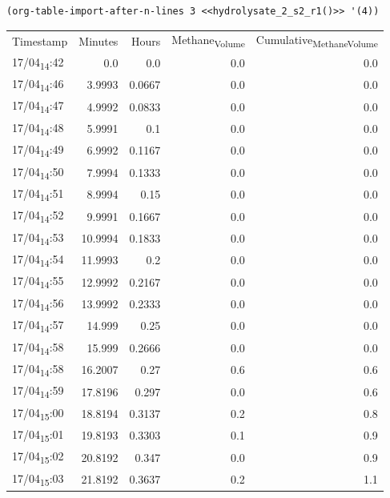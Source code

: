 \documentclass[11pt]{article}
\begin{document}
\begin{verbatim}
(org-table-import-after-n-lines 3 <<hydrolysate_2_s2_r1()>> '(4))
\end{verbatim}

\begin{center}
\begin{tabular}{lrrrr}
Timestamp & Minutes & Hours & Methane\textsubscript{Volume} & Cumulative\textsubscript{Methane}\textsubscript{Volume}\\[0pt]
17/04\textsubscript{14}:42 & 0.0 & 0.0 & 0.0 & 0.0\\[0pt]
17/04\textsubscript{14}:46 & 3.9993 & 0.0667 & 0.0 & 0.0\\[0pt]
17/04\textsubscript{14}:47 & 4.9992 & 0.0833 & 0.0 & 0.0\\[0pt]
17/04\textsubscript{14}:48 & 5.9991 & 0.1 & 0.0 & 0.0\\[0pt]
17/04\textsubscript{14}:49 & 6.9992 & 0.1167 & 0.0 & 0.0\\[0pt]
17/04\textsubscript{14}:50 & 7.9994 & 0.1333 & 0.0 & 0.0\\[0pt]
17/04\textsubscript{14}:51 & 8.9994 & 0.15 & 0.0 & 0.0\\[0pt]
17/04\textsubscript{14}:52 & 9.9991 & 0.1667 & 0.0 & 0.0\\[0pt]
17/04\textsubscript{14}:53 & 10.9994 & 0.1833 & 0.0 & 0.0\\[0pt]
17/04\textsubscript{14}:54 & 11.9993 & 0.2 & 0.0 & 0.0\\[0pt]
17/04\textsubscript{14}:55 & 12.9992 & 0.2167 & 0.0 & 0.0\\[0pt]
17/04\textsubscript{14}:56 & 13.9992 & 0.2333 & 0.0 & 0.0\\[0pt]
17/04\textsubscript{14}:57 & 14.999 & 0.25 & 0.0 & 0.0\\[0pt]
17/04\textsubscript{14}:58 & 15.999 & 0.2666 & 0.0 & 0.0\\[0pt]
17/04\textsubscript{14}:58 & 16.2007 & 0.27 & 0.6 & 0.6\\[0pt]
17/04\textsubscript{14}:59 & 17.8196 & 0.297 & 0.0 & 0.6\\[0pt]
17/04\textsubscript{15}:00 & 18.8194 & 0.3137 & 0.2 & 0.8\\[0pt]
17/04\textsubscript{15}:01 & 19.8193 & 0.3303 & 0.1 & 0.9\\[0pt]
17/04\textsubscript{15}:02 & 20.8192 & 0.347 & 0.0 & 0.9\\[0pt]
17/04\textsubscript{15}:03 & 21.8192 & 0.3637 & 0.2 & 1.1\\[0pt]

\end{tabular}
\end{center}
\end{document}

